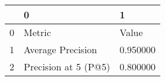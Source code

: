 \begin{tabular}{lll}
\toprule
 & 0 & 1 \\
\midrule
0 & Metric & Value \\
1 & Average Precision & 0.950000 \\
2 & Precision at 5 (P@5) & 0.800000 \\
\bottomrule
\end{tabular}
